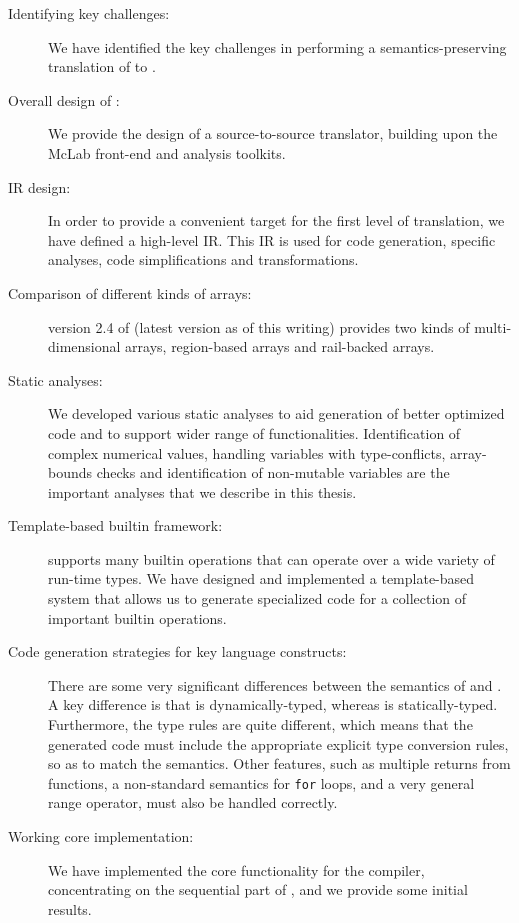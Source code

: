 \begin{description}

\item[Identifying key challenges:] We have identified the key challenges
in performing a semantics-preserving translation of \matlab to \xten.

\item[Overall design of \mixten:] We provide the design of a 
source-to-source translator, building upon the McLab front-end and
analysis toolkits.

\item[\mixten IR design:] In order to provide a convenient
target for the first level of translation, we have defined a high-level
\mixten IR.  This IR is used for code generation, \xten specific analyses, 
code simplifications and transformations.

\item[Comparison of different kinds of \xten arrays:] version 2.4 of \xten 
(latest version as of this writing) provides two kinds of multi-dimensional 
arrays, region-based arrays and rail-backed arrays.  

\item[Static analyses:] We developed various static analyses to aid generation
of better optimized code and to support wider range of \matlab functionalities.
Identification of complex numerical values, handling variables with	
type-conflicts, array-bounds checks and identification of non-mutable variables
are the important analyses that we describe in this thesis.

\item[Template-based builtin framework:] \matlab supports many builtin
operations that can operate over a wide variety of run-time types.  We
have designed and implemented a template-based system that allows us to
generate specialized \xten code for a collection of important builtin
operations.

\item[Code generation strategies for key language constructs:]  There
are some very significant differences between the semantics of \matlab
and \xten.  A key difference is that \matlab is dynamically-typed,
whereas \xten is statically-typed.   Furthermore, the type rules are
quite different, which means that the generated \xten code must include
the appropriate explicit type conversion rules, so as to match the
\matlab semantics.   Other \matlab features, such as multiple returns
from functions, a non-standard semantics for \texttt{for} loops, and a
very general range operator, must also be handled correctly.

\item[Working core implementation:] We have implemented the core
functionality for the \mixten compiler, concentrating on the sequential
part of \xten, and we provide some initial results.

\end{description}
